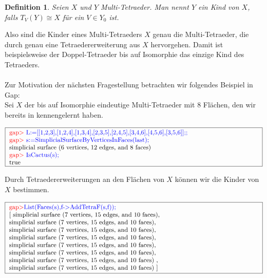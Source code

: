 \documentclass[12pt,titlepage,twoside,cleardoublepage]{article}
\theoremstyle{nummermitklammern}
\newtheorem{definition}[temp]{Definition}
\newtheorem{definition}[zahl]{Definition}
\numberwithin{equation}{section}
\begin{document}
\begin{definition}
Seien $X$ und $Y$ Multi-Tetraeder. Man nennt $Y$ ein Kind von $X$, falls $T_V(Y)\cong X$ für ein $V\in Y_0$ ist.
\end{definition}
Also sind die Kinder eines Multi-Tetraeders $X$ genau die Multi-Tetraeder, die durch genau eine Tetraedererweiterung aus $X$ hervorgehen.
Damit ist beispielsweise der Doppel-Tetraeder bis auf Isomorphie das einzige Kind des Tetraeders. \\\\
Zur Motivation der nächsten Fragestellung betrachten wir folgendes Beispiel in Gap:\\
Sei $X$ der bis auf Isomorphie eindeutige Multi-Tetraeder mit 8 Flächen, den wir bereits in  kennengelernt haben. 
\begin{center}
$\fbox{
\parbox{14cm}{
\textcolor{red}{gap$>$} \textcolor{blue}{L:=[[1,2,3],[1,2,4],[1,3,4],[2,3,5],[2,4,5],[3,4,6],[4,5,6],[3,5,6]];;}\newline
\textcolor{red}{gap$>$} \textcolor{blue}{s:=SimplicialSurfaceByVerticesInFaces(last);}\newline
simplicial surface (6 vertices, 12 edges, and 8 faces)\newline
\textcolor{red}{gap$>$} \textcolor{blue}{IsCactus(s);}\newline
true
}}$
\end{center}
Durch Tetraedererweiterungen an den Flächen von $X$ können wir die Kinder von $X$ bestimmen.
\begin{center}
$\fbox{
\parbox{14cm}{
\textcolor{red}{gap$>$}\textcolor{blue}{ List(Faces(s),f-$>$AddTetraF(s,f));}\newline
[ simplicial surface (7 vertices, 15 edges, and 10 faces),\newline
simplicial surface (7 vertices, 15 edges, and 10 faces),\newline
 simplicial surface (7 vertices, 15 edges, and 10 faces),\newline
 simplicial surface (7 vertices, 15 edges, and 10 faces),\newline
 simplicial surface (7 vertices, 15 edges, and 10 faces),\newline
 simplicial surface (7 vertices, 15 edges, and 10 faces),\newline
  simplicial surface (7 vertices, 15 edges, and 10 faces)
    ,\newline
  simplicial surface (7 vertices, 15 edges, and 10 faces)
 ]
 }}$
 \end{center}
\end{document}
